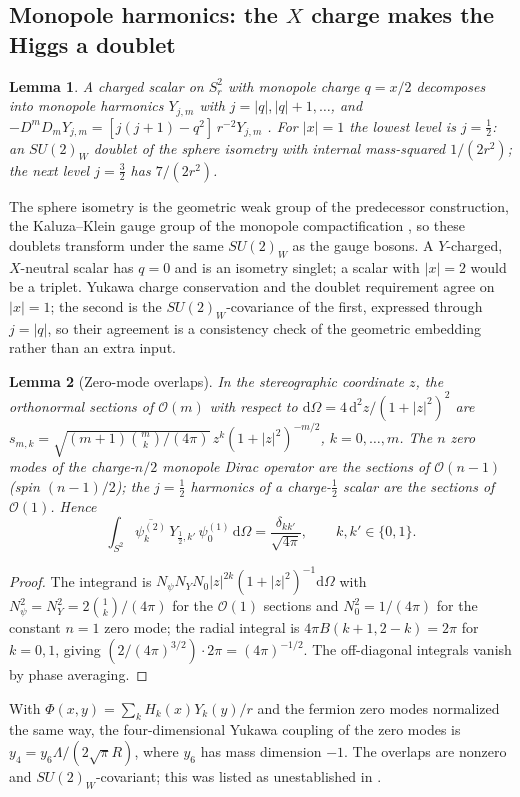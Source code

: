 \documentclass[11pt,letterpaper]{article}
\newtheorem{lemma}{Lemma}
\newcommand{\dd}{\mathrm d}
\newcommand{\Lam}{\Lambda}
\begin{document}
\subsection{Monopole harmonics: the \texorpdfstring{$X$}{X} charge makes the Higgs a doublet}

\begin{lemma}\label{lem:doublet}
A charged scalar on $S^2_r$ with monopole charge $q=x/2$ decomposes into monopole harmonics $Y_{j,m}$ with $j=|q|,|q|+1,\ldots$, and $-D^mD_mY_{j,m}=[j(j+1)-q^2]\,r^{-2}Y_{j,m}$ \cite{WuYang}. For $|x|=1$ the lowest level is $j=\tfrac12$: an $SU(2)_W$ doublet of the sphere isometry with internal mass-squared $1/(2r^2)$; the next level $j=\tfrac32$ has $7/(2r^2)$.
\end{lemma}

The sphere isometry is the geometric weak group of the predecessor construction, the Kaluza--Klein gauge group of the monopole compactification \cite{RSS83}, so these doublets transform under the same $SU(2)_W$ as the gauge bosons. A $Y$-charged, $X$-neutral scalar has $q=0$ and is an isometry singlet; a scalar with $|x|=2$ would be a triplet. Yukawa charge conservation and the doublet requirement agree on $|x|=1$; the second is the $SU(2)_W$-covariance of the first, expressed through $j=|q|$, so their agreement is a consistency check of the geometric embedding rather than an extra input.

\begin{lemma}[Zero-mode overlaps]\label{lem:overlap}
In the stereographic coordinate $z$, the orthonormal sections of $\mathcal O(m)$ with respect to $\dd\Omega=4\,\dd^2z/(1+|z|^2)^2$ are $s_{m,k}=\sqrt{(m+1)\binom mk/(4\pi)}\,z^k(1+|z|^2)^{-m/2}$, $k=0,\ldots,m$. The $n$ zero modes of the charge-$n/2$ monopole Dirac operator are the sections of $\mathcal O(n-1)$ (spin $(n-1)/2$); the $j=\tfrac12$ harmonics of a charge-$\tfrac12$ scalar are the sections of $\mathcal O(1)$. Hence
\begin{equation}
\int_{S^2}\overline{\psi^{(2)}_{k}}\,Y_{\frac12,k'}\,\psi^{(1)}_{0}\,\dd\Omega=\frac{\delta_{kk'}}{\sqrt{4\pi}},\qquad k,k'\in\{0,1\}.
\end{equation}
\end{lemma}
\begin{proof}
The integrand is $N_\psi N_YN_0|z|^{2k}(1+|z|^2)^{-1}\dd\Omega$ with $N_\psi^2=N_Y^2=2\binom1k/(4\pi)$ for the $\mathcal O(1)$ sections and $N_0^2=1/(4\pi)$ for the constant $n=1$ zero mode; the radial integral is $4\pi B(k+1,2-k)=2\pi$ for $k=0,1$, giving $(2/(4\pi)^{3/2})\cdot2\pi=(4\pi)^{-1/2}$. The off-diagonal integrals vanish by phase averaging.
\end{proof}
With $\Phi(x,y)=\sum_kH_k(x)Y_k(y)/r$ and the fermion zero modes normalized the same way, the four-dimensional Yukawa coupling of the zero modes is $y_4=y_6\Lam/(2\sqrt\pi R)$, where $y_6$ has mass dimension $-1$. The overlaps are nonzero and $SU(2)_W$-covariant; this was listed as unestablished in \cite{neutral}.
\end{document}
